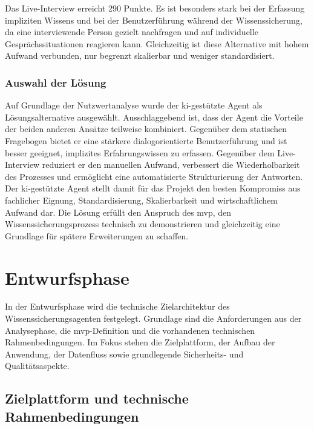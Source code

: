 \documentclass[
  10pt,
  ngerman,
  a4paper,
  toc=graduated,
  numbers=noenddot,
  headings=standardclasses,
  nonumberlist
]{scrartcl}
\begin{document}
Das Live-Interview erreicht 290 Punkte. Es ist besonders stark bei der Erfassung impliziten Wissens und bei der Benutzerführung während der Wissenssicherung, da eine interviewende Person gezielt nachfragen und auf individuelle Gesprächssituationen reagieren kann. Gleichzeitig ist diese Alternative mit hohem Aufwand verbunden, nur begrenzt skalierbar und weniger standardisiert.

\subsubsection{Auswahl der Lösung}
\label{auswahl_der_lösung}

Auf Grundlage der Nutzwertanalyse wurde der \gls{ki}-gestützte Agent als Lösungsalternative ausgewählt. Ausschlaggebend ist, dass der Agent die Vorteile der beiden anderen Ansätze teilweise kombiniert. Gegenüber dem statischen Fragebogen bietet er eine stärkere dialogorientierte Benutzerführung und ist besser geeignet, implizites Erfahrungswissen zu erfassen. Gegenüber dem Live-Interview reduziert er den manuellen Aufwand, verbessert die Wiederholbarkeit des Prozesses und ermöglicht eine automatisierte Strukturierung der Antworten. Der \gls{ki}-gestützte Agent stellt damit für das Projekt den besten Kompromiss aus fachlicher Eignung, Standardisierung, Skalierbarkeit und wirtschaftlichem Aufwand dar. Die Lösung erfüllt den Anspruch des \gls{mvp}, den Wissenssicherungsprozess technisch zu demonstrieren und gleichzeitig eine Grundlage für spätere Erweiterungen zu schaffen.

\section{Entwurfsphase}
\label{entwurfsphase}

In der Entwurfsphase wird die technische Zielarchitektur des Wissenssicherungsagenten festgelegt. Grundlage sind die Anforderungen aus der Analysephase, die \gls{mvp}-Definition und die vorhandenen technischen Rahmenbedingungen. Im Fokus stehen die Zielplattform, der Aufbau der Anwendung, der Datenfluss sowie grundlegende Sicherheits- und Qualitätsaspekte.

\subsection{Zielplattform und technische Rahmenbedingungen}
\label{zielplattform_und_technische_rahmenbedingungen}
\end{document}
